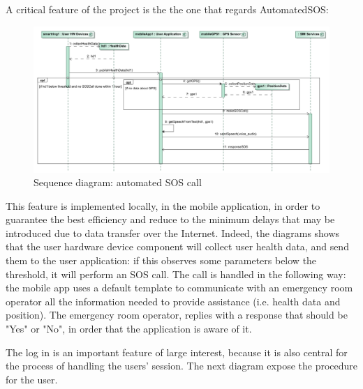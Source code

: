 \par 
A critical feature of the project is the the one that regards AutomatedSOS: 

\begin{figure}[H]
\includegraphics[width=\linewidth]{Images/automatedsos.pdf}
\caption{ Sequence diagram: automated SOS call}
\label{fig:automatedSOScall}
\end{figure}

This feature is implemented locally, in the mobile application, in order to guarantee the best efficiency and reduce to the minimum delays
that may be introduced due to data transfer over the Internet. 
Indeed, the diagrams shows that the user hardware device component will collect user health data, and send them to the user application: if this observes some parameters below the threshold, it will perform an SOS call. 
The call is handled in the following way: the mobile app uses a default template to communicate with an emergency room operator all the
information needed to provide assistance (i.e. health data and position). 
The emergency room operator, replies with a response that should be "Yes" or "No", in order that the application is aware of it.  \\

\par 
The log in is an important feature of large interest, because it is also central for the process of handling the users' session. The next
diagram expose the procedure for the user.

